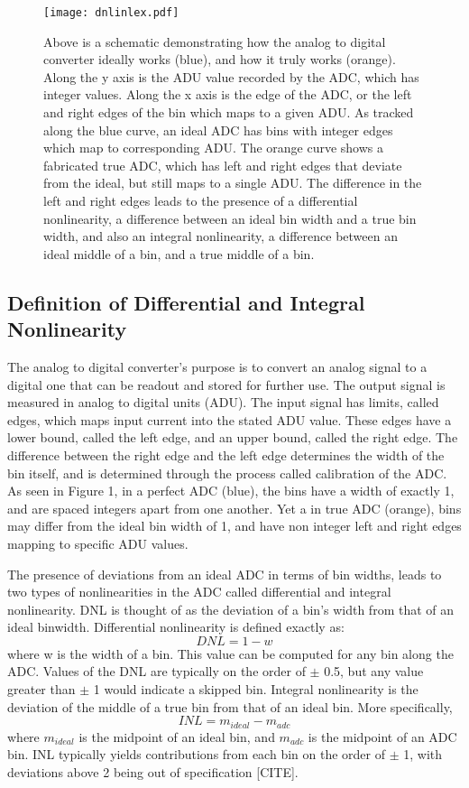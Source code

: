 \documentclass[11pt, letterpaper]{article}
\begin{document}
\begin{figure}
	\texttt{[image: dnlinlex.pdf]}
	\caption{Above is a schematic demonstrating how the analog to digital converter ideally works (blue), and how it truly works (orange). Along the y axis is the ADU value recorded by the ADC, which has integer values. Along the x axis is the edge of the ADC, or the left and right edges of the bin which maps to a given ADU. As tracked along the blue curve, an ideal ADC has bins with integer edges which map to corresponding ADU. The orange curve shows a fabricated true ADC, which has left and right edges that deviate from the ideal, but still maps to a single ADU. The difference in the left and right edges leads to the presence of a differential nonlinearity, a difference between an ideal bin width and a true bin width, and also an integral nonlinearity, a difference between an ideal middle of a bin, and a true middle of a bin.}
\end{figure}

\subsection{Definition of Differential and Integral Nonlinearity}
\indent 


The analog to digital converter’s purpose is to convert an analog signal to a digital one that can be readout and stored for further use. 
The output signal is measured in analog to digital units (ADU). 
The input signal has limits, called edges, which maps input current into the stated ADU value. 
These edges have a lower bound, called the left edge, and an upper bound, called the right edge.
The difference between the right edge and the left edge determines the width of the bin itself, and is determined through the process called calibration of the ADC. 
As seen in Figure 1, in a perfect ADC (blue), the bins have a width of exactly 1, and are spaced integers apart from one another. 
Yet a in true ADC (orange), bins may differ from the ideal bin width of 1, and have non integer left and right edges mapping to specific ADU values. 
\indent 


The presence of deviations from an ideal ADC in terms of bin widths, leads to two types of nonlinearities in the ADC called differential and integral nonlinearity. 
DNL is thought of as the deviation of a bin's width from that of an ideal binwidth. 
Differential nonlinearity is defined exactly as: 
\begin{equation}\label{}
DNL =1- w  
\end{equation}
where w is the width of a bin. 
This value can be computed for any bin along the ADC. 
Values of the DNL are typically on the order of $\pm$ 0.5, but any value greater than $\pm$ 1 would indicate a skipped bin. 
Integral nonlinearity is the deviation of the middle of a true bin from that of an ideal bin.
More specifically, 
\begin{equation}\label{}
INL = m_{ideal} - m_{adc} 
\end{equation}
where $m_{ideal}$ is the midpoint of an ideal bin, and $m_{adc}$ is the midpoint of an ADC bin. 
INL typically yields contributions from each bin on the order of $\pm$ 1, with deviations above 2 being out of specification [CITE].
\indent
\end{document}

